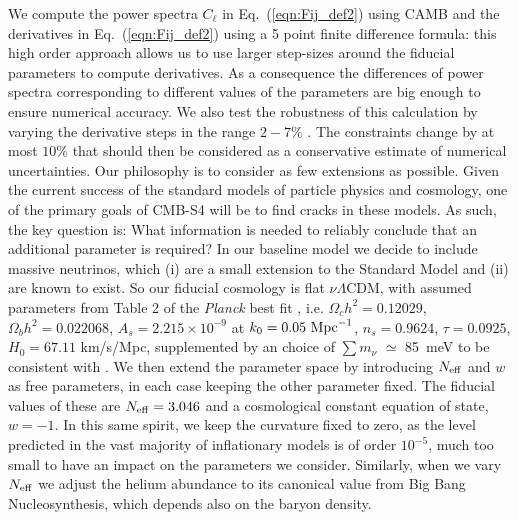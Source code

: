 \documentclass[aps,prd,reprint,superscriptaddress,nofootinbib,floatfix]{revtex4-1}
\newcommand\refeq[1]{Eq.~(\ref{eqn:#1})}
\begin{document}
We compute the power spectra $C_{\ell}$ in \refeq{Fij_def2} using CAMB \cite{Howlett:2012mh,Lewis:1999bs} and
the derivatives in \refeq{Fij_def2} using a 5 point finite difference formula:
this high order approach allows us to use larger step-sizes around the fiducial parameters to compute derivatives. As a consequence the differences of power spectra corresponding to different values of the parameters are big enough to ensure numerical accuracy. We also test the robustness of this calculation by varying the derivative steps in the range $2-7\%$ . The constraints change by at most $10\%$ that should then be considered as a conservative estimate of numerical uncertainties. 
Our philosophy is to consider as few extensions as possible. Given the current success of the standard models of particle physics and cosmology, one of the primary goals of CMB-S4 will be to find cracks in these models. As such, the key question is: What information is needed to reliably conclude that an additional parameter is required? In our baseline model we decide to include massive neutrinos, which (i) are a small extension to the Standard Model and (ii) are known to exist. So our fiducial cosmology is flat $\nu \Lambda$CDM, with assumed 
parameters from Table 2 of the \textit{Planck} best fit \cite{planck-collaboration:2014g}, i.e. $\Omega_c h^2 = 0.12029$, $\Omega_b h^2 = 0.022068$, $A_s = 2.215\times10^{-9}$ at $k_0 = 0.05\ {\rm Mpc}^{-1}$, $n_s = 0.9624$, $\tau = 0.0925$, $H_0 = 67.11$ km/s/Mpc, supplemented by an choice of $\sum m_\nu$ $\simeq$ 85\ meV to be consistent with \cite{wu:2014}.  
We then extend the parameter space by introducing $N_{\rm eff}$ and $w$ as free parameters, in each case keeping the other parameter fixed.
The fiducial values of these are $N_{\rm eff}=3.046$ and a cosmological constant equation of state, $w=-1$. In this same spirit, we keep the curvature fixed to zero, as the level predicted in the vast majority of inflationary models is of order $10^{-5}$, much too small to have an impact on the parameters we consider. Similarly, when we vary $N_{\rm eff}$ we adjust the helium abundance to its canonical value from Big Bang Nucleosynthesis, which depends also on the baryon density.
\end{document}
